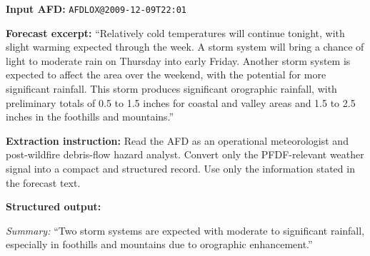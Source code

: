 \begin{table}[t!]
\centering
\caption{The LLM is constrained to fill a predefined JSON schema with 18 numeric PFDF-relevant weather indicators and one concise textual summary. These fields decompose broad forecast signals, including rainfall intensity, storm duration or repetition, flash-flood language, convection, terrain enhancement, antecedent wetness, burn-scar sensitivity, and overall PFDF weather risk.}
\label{tab:prompt_weather_example}
\scriptsize
\begin{tcolorbox}[
    colback=white,
    colframe=green!40!black,
    boxrule=1pt,
    title={LLM-based Processing to Structure Area Forecast Discussion Text Corpus},
    colbacktitle=green!40!black,
    coltitle=white
]

\textbf{Input AFD:} \texttt{AFDLOX@2009-12-09T22:01}

\textbf{Forecast excerpt:}
``Relatively cold temperatures will continue tonight, with slight warming expected
through the week. A storm system will bring a chance of light to moderate rain on
Thursday into early Friday. Another storm system is expected to affect the area
over the weekend, with the potential for more significant rainfall. This storm
produces significant orographic rainfall, with preliminary totals of 0.5 to 1.5
inches for coastal and valley areas and 1.5 to 2.5 inches in the foothills and
mountains.''

\textbf{Extraction instruction:}
Read the AFD as an operational meteorologist and post-wildfire debris-flow hazard analyst. Convert only the PFDF-relevant weather signal into a compact and structured record. Use only the information stated in the forecast text.

\textbf{Structured output:}

\emph{Summary:} ``Two storm systems are expected with moderate to significant
rainfall, especially in foothills and mountains due to orographic enhancement.''


\end{tcolorbox}
\end{table}
